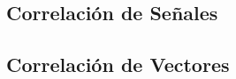 \subsection{Correlación de Señales}\label{subs:corresignal}

%
%
%
%

\subsection{Correlación de Vectores}\label{subs:correvector}

